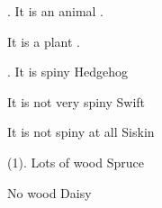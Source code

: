 \documentclass{article}
\begin{document}
\begin{biokey}

. It is an animal .

\AN  It is a plant .

. It is spiny \TT Hedgehog

\AN  It is not very spiny \TT Swift

\AAN  It is not spiny at all \TT Siskin

(1). Lots of wood \TT Spruce

\AN No wood \TT Daisy

\end{biokey}
\end{document}
